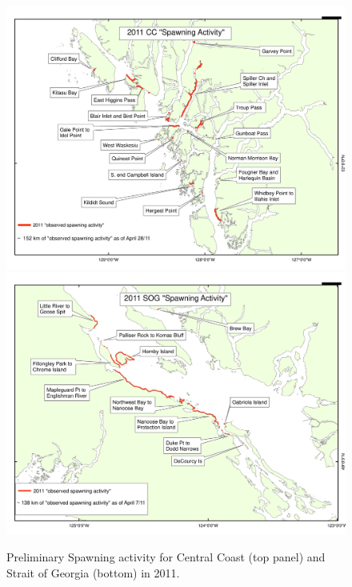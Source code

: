 \begin{figure}[!tbp]
	\ContinuedFloat
	\centering
	\includegraphics[scale=0.5]{../Figs/PBSfigs/2011-CC-Prelim-WG.pdf}\\
	\includegraphics[scale=0.5]{../Figs/PBSfigs/2011-SOG-Prelim-WG.pdf}
	\caption{Preliminary Spawning activity for Central Coast (top panel) and Strait of Georgia (bottom) in 2011.}
\end{figure}
